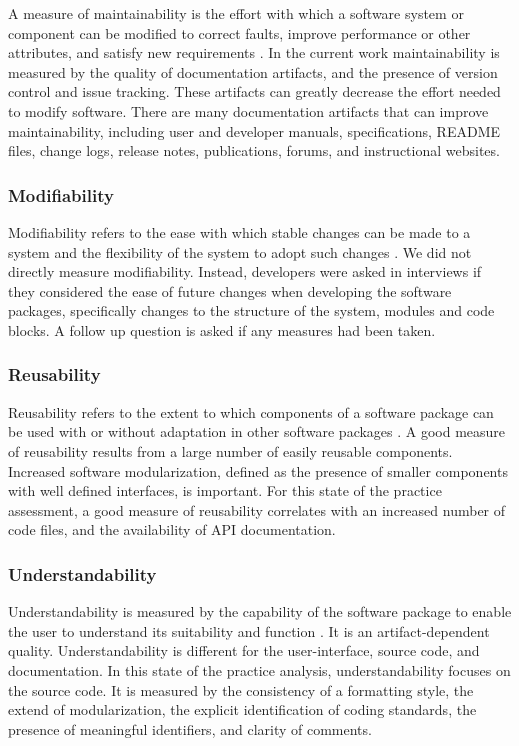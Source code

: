 \documentclass[final, 3p, times, authoryear]{elsarticle}
\begin{document}
A measure of maintainability is the effort with which a software system or
component can be modified to correct faults, improve performance or other
attributes, and satisfy new requirements \citep{IEEEStdGlossarySET1990,
boehm2007software}. In the current work maintainability is measured by the
quality of documentation artifacts, and the presence of version control and
issue tracking. These artifacts can greatly decrease the effort needed to modify
software. There are many documentation artifacts that can improve
maintainability, including user and developer manuals, specifications, README
files, change logs, release notes, publications, forums, and instructional
websites. 

\subsubsection{Modifiability}

Modifiability refers to the ease with which stable changes can be made to a
system and the flexibility of the system to adopt such changes \citep{8016712}.
We did not directly measure modifiability. Instead, developers were asked in
interviews if they considered the ease of future changes when developing the
software packages, specifically changes to the structure of the system, modules
and code blocks. A follow up question is asked if any measures had been taken.

\subsubsection{Reusability}

Reusability refers to the extent to which components of a software package can
be used with or without adaptation in other software packages
\citep{kalagiakos2003non}. A good measure of reusability results from a large
number of easily reusable components. Increased software modularization, defined
as the presence of smaller components with well defined interfaces, is
important. For this state of the practice assessment, a good measure of
reusability correlates with an increased number of code files, and the
availability of API documentation.

\subsubsection{Understandability}

Understandability is measured by the capability of the software package to
enable the user to understand its suitability and function \citep{ISO9126}. It
is an artifact-dependent quality. Understandability is different for the
user-interface, source code, and documentation. In this state of the practice
analysis, understandability focuses on the source code. It is measured by the
consistency of a formatting style, the extend of modularization, the explicit
identification of coding standards, the presence of meaningful identifiers, and
clarity of comments. 
\end{document}
